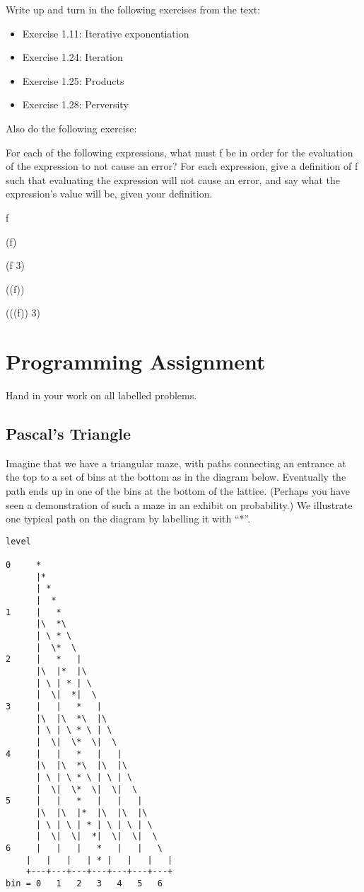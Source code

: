 Write up and turn in the following exercises from the text:

\begin{itemize}
\item Exercise 1.11: Iterative exponentiation

\item Exercise 1.24: Iteration

\item Exercise 1.25: Products

\item Exercise 1.28: Perversity
\end{itemize}

Also do the following exercise:

For each of the following expressions, what must {\cf f} be in order for the
evaluation of the expression to not cause an error?  For each expression, give
a definition of {\cf f} such that evaluating the expression will not cause an
error, and say what the expression's value will be, given your definition.

\beginlisp
f

(f)

(f 3)

((f))

(((f)) 3)
\endlisp

\section{Programming Assignment}

Hand in your work on all labelled problems.

\subsection{Pascal's Triangle}

Imagine that we have a triangular maze, with paths connecting an entrance at
the top to a set of bins at the bottom as in the diagram below.  Eventually the
path ends up in one of the bins at the bottom of the lattice.  (Perhaps you
have seen a demonstration of such a maze in an exhibit on probability.)  We
illustrate one typical path on the diagram by labelling it with ``*''.

\begin{minipage}[t]{\linewidth}
\begin{verbatim}
level

0     *
      |*  
      | * 
      |  *
1     |   *
      |\  *\
      | \ * \
      |  \*  \
2     |   *   |
      |\  |*  |\
      | \ | * | \
      |  \|  *|  \
3     |   |   *   |
      |\  |\  *\  |\ 
      | \ | \ * \ | \
      |  \|  \*  \|  \
4     |   |   *   |   |
      |\  |\  *\  |\  |\  
      | \ | \ * \ | \ | \ 
      |  \|  \*  \|  \|  \      
5     |   |   *   |   |   |
      |\  |\  |*  |\  |\  |\  
      | \ | \ | * | \ | \ | \ 
      |  \|  \|  *|  \|  \|  \
6     |   |   |   *   |   |   \
    |   |   |   | * |   |   |   |
    +---+---+---+---+---+---+---+
bin = 0   1   2   3   4   5   6 
\end{verbatim}
\end{minipage}

